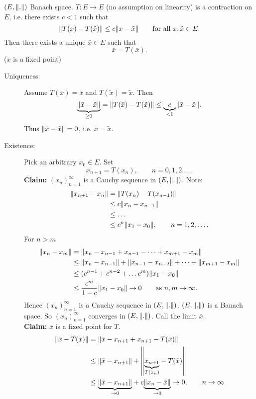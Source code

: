 \begin{theorem}
	$(E, \norm{.})$ Banach space. $T: E \to E$ (no assumption on linearity) is a contraction on $E$, i.e. there exists $c<1$ such that
	\[
		\norm{T(x)-T(\tilde x)} \leq c \norm{x- \tilde x} \qquad \text{for all }x,\tilde x \in E.
	\]
	Then there exists a unique $ \bar{x} \in E$ such that 
	\[
		\bar{x} = T( \bar{ x}).
	\]
	($\bar{x}$ is a fixed point)
\end{theorem}
\begin{beweis}
	\begin{description}
		\item[Uniqueness:]Assume $T( \bar{x}) = \bar{x}$ and $T ( \tilde x) = \tilde x$. Then
		\[
			\underset{\geq 0}{\underbrace{\norm{ \bar{ x} - \tilde x }}} = \norm{T( \bar{x})- T( \tilde x)} \leq \underset{< 1}{\underbrace{c}} \norm{ \bar{x}- \tilde x}.
		\] 
		Thus $\norm{\bar{x}- \tilde x} = 0$, i.e. $\bar{x} = \tilde x$.
		\item[Existence:] Pick an arbitrary $x_0 \in E$. Set
		\[
			x_{n+1} = T(x_{n}), \qquad n=0,1,2,\dots.
		\]
		\textbf{Claim:} \text{    }     $(x_n)_{n=1}^{\infty}$ is a Cauchy sequence in $(E,\norm{.})$.
		Note:
		\begin{align*}
			\norm{x_{n+1}-x_n}  &= \norm{T(x_n)-T(x_{n-1})} \\
			&\leq  c \norm{x_n - x_{n-1}} \\
			&\leq \dots \\
			&\leq  c^n \norm{x_1-x_0}, \qquad n=1,2,\dots.
		\end{align*}
		For $n>m$
		\begin{align*}
			\norm{x_n-x_m} &= \norm{x_n - x_{n-1}+ x_{n-1}- \dots + x_{m+1}- x_m} \\
			&\leq \norm{x_n - x_{n-1}} + \norm{x_{n-1} - x_{n-2}} + \dots + \norm{x_{m+1}- x_m} \\
			&\leq (c^{n-1}+ c^{n-2} + \dots c^m) \norm{x_1-x_0} \\
			&\leq \frac{c^m}{1-c} \norm{x_1 - x_0} \to 0 \qquad \text{as }n,m \to \infty.
		\end{align*}
		Hence $(x_n)_{n=1}^{\infty}$ is a Cauchy sequence in $(E,\norm{.})$. $(E, \norm{.})$ is a Banach space. So $(x_n)_{n=1}^{\infty}$ converges in $(E,\norm{.})$. Call the limit $\bar{x}$. \\
		\textbf{Claim:} \text{    }     $\bar{x}$ is a fixed point for $T$. 
		\begin{align*}
			\norm{\bar{ x}- T(\bar{x})} & = \norm{\bar{x}-x_{n+1}+ x_{n+1} - T(\bar{x})} \\
			&\leq \norm{\bar{x}-x_{n+1}} + \norm{\underset{T(x_n)}{\underbrace{x_{n+1}}} - T(\bar{x})} \\
			&\leq \underset{\to 0}{\underbrace{\norm{\bar{x}- x_{n+1}}}} + c \underset{\to 0}{\underbrace{\norm{x_n - \bar{x}}}} \to 0, \qquad n \to \infty
		\end{align*}
	\end{description}
\end{beweis}
